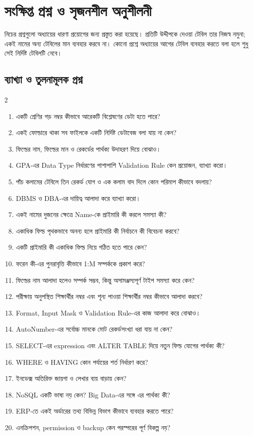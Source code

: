 \section{সংক্ষিপ্ত প্রশ্ন ও সৃজনশীল অনুশীলনী}
\label{sec:ch06-exercises}
 নিচের প্রশ্নগুলো অধ্যায়ের ধারণা প্রয়োগের জন্য প্রস্তুত করা হয়েছে। প্রতিটি উদ্দীপকে দেওয়া টেবিল তার নিজস্ব নমুনা; একই নামের অন্য টেবিলের মান ব্যবহার করবে না। কোনো প্রশ্নে অধ্যায়ের আগের টেবিল ব্যবহার করতে বলা হলে শুধু সেই নির্দিষ্ট টেবিলটি নেবে।

\subsection{ব্যাখ্যা ও তুলনামূলক প্রশ্ন}
\begin{multicols}{2}
\small
\begin{enumerate}[itemsep=0pt,topsep=1pt]
\item একটি শ্রেণির গড় নম্বর কীভাবে আরেকটি বিশ্লেষণের ডেটা হতে পারে?
\item একই ফোল্ডারে থাকা সব ফাইলকে একটি নির্দিষ্ট ডেটাবেজ বলা যায় না কেন?
\item ফিল্ডের নাম, ফিল্ডের মান ও রেকর্ডের পার্থক্য উদাহরণ দিয়ে বোঝাও।
\item GPA-এর Data Type নির্ধারণের পাশাপাশি Validation Rule কেন প্রয়োজন, ব্যাখ্যা করো।
\item পাঁচ কলামের টেবিলে তিন রেকর্ড যোগ ও এক কলাম বাদ দিলে কোন পরিমাপ কীভাবে বদলায়?
\item DBMS ও DBA-এর দায়িত্ব আলাদা করে ব্যাখ্যা করো।
\item একই নামের দুজনের ক্ষেত্রে Name-কে প্রাইমারি কী করলে সমস্যা কী?
\item একাধিক ফিল্ড পৃথকভাবে অনন্য হলে প্রাইমারি কী নির্বাচনে কী বিবেচনা করবে?
\item একটি প্রাইমারি কী একাধিক ফিল্ড নিয়ে গঠিত হতে পারে কেন?
\item ফরেন কী-এর পুনরাবৃত্তি কীভাবে 1:M সম্পর্ককে প্রকাশ করে?
\item ফিল্ডের নাম আলাদা হলেও সম্পর্ক সম্ভব, কিন্তু অসামঞ্জস্যপূর্ণ টাইপ সমস্যা করে কেন?
\item পরীক্ষায় অনুপস্থিত শিক্ষার্থীর নম্বর এবং শূন্য পাওয়া শিক্ষার্থীর নম্বর কীভাবে আলাদা করবে?
\item Format, Input Mask ও Validation Rule-এর কাজ আলাদা করে বোঝাও।
\item AutoNumber-এর সর্বোচ্চ মানকে মোট রেকর্ডসংখ্যা ধরা যায় না কেন?
\item SELECT-এর expression এবং ALTER TABLE দিয়ে নতুন ফিল্ড যোগের পার্থক্য কী?
\item WHERE ও HAVING কোন পর্যায়ের শর্ত নির্ধারণ করে?
\item ইনডেক্স অতিরিক্ত জায়গা ও লেখার ব্যয় বাড়ায় কেন?
\item NoSQL একটি ভাষা নয় কেন? Big Data-এর সঙ্গে এর পার্থক্য কী?
\item ERP-তে একই অর্ডারের তথ্য বিভিন্ন বিভাগ কীভাবে ব্যবহার করতে পারে?
\item এনক্রিপশন, permission ও backup কেন পরস্পরের পূর্ণ বিকল্প নয়?
\end{enumerate}
\end{multicols}

